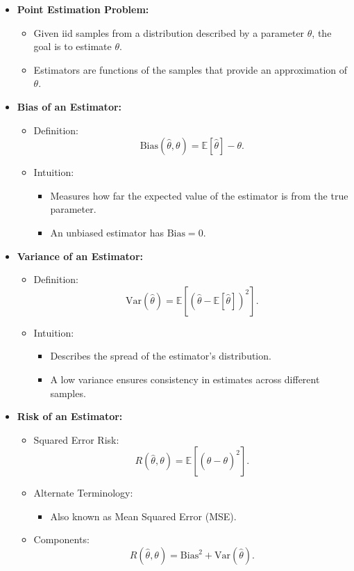 \documentclass{article}
\begin{document}
\begin{itemize}
  \item \textbf{Point Estimation Problem:}
    \begin{itemize}
      \item Given iid samples from a distribution described by a parameter $\theta$, the goal is to estimate $\theta$.
      \item Estimators are functions of the samples that provide an approximation of $\theta$.
    \end{itemize}

  \item \textbf{Bias of an Estimator:}
    \begin{itemize}
      \item Definition:
        \[
          \text{Bias}(\hat{\theta}, \theta) = \mathbb{E}[\hat{\theta}] - \theta.
        \]
      \item Intuition:
        \begin{itemize}
          \item Measures how far the expected value of the estimator is from the true parameter.
          \item An unbiased estimator has $\text{Bias} = 0$.
        \end{itemize}
    \end{itemize}

  \item \textbf{Variance of an Estimator:}
    \begin{itemize}
      \item Definition:
        \[
          \text{Var}(\hat{\theta}) = \mathbb{E}[(\hat{\theta} - \mathbb{E}[\hat{\theta}])^2].
        \]
      \item Intuition:
        \begin{itemize}
          \item Describes the spread of the estimator's distribution.
          \item A low variance ensures consistency in estimates across different samples.
        \end{itemize}
    \end{itemize}

  \item \textbf{Risk of an Estimator:}
    \begin{itemize}
      \item Squared Error Risk:
        \[
          R(\hat{\theta}, \theta) = \mathbb{E}[(\hat{\theta} - \theta)^2].
        \]
      \item Alternate Terminology:
        \begin{itemize}
          \item Also known as Mean Squared Error (MSE).
        \end{itemize}
      \item Components:
        \[
          R(\hat{\theta}, \theta) = \text{Bias}^2 + \text{Var}(\hat{\theta}).
        \]
    \end{itemize}


\end{itemize}
\end{document}
